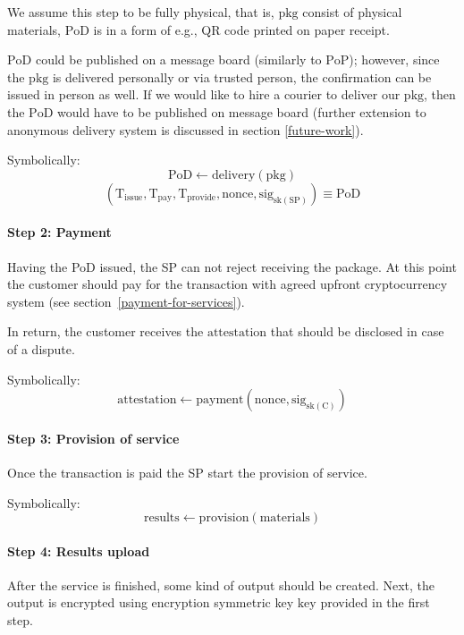 \documentclass{ieeeaccess}
\begin{document}
We assume this step to be fully physical, that is, $\mathrm{pkg}$ consist of physical materials, $\mathrm{PoD}$ is in a form of e.g., QR code printed on paper receipt. 

$\mathrm{PoD}$ could be published on a message board (similarly to $\mathrm{PoP}$); however, since the $\mathrm{pkg}$ is delivered personally or via trusted person, the confirmation can be issued in person as well. If we would like to hire a courier to deliver our $\mathrm{pkg}$, then the $\mathrm{PoD}$ would have to be published on message board (further extension to anonymous delivery system is discussed in section \ref{future-work}).

Symbolically: 
\[
\mathrm{PoD} \gets \mathrm{delivery}(\mathrm{pkg})
\]
\[
(\mathrm{T}_\mathrm{issue}, \mathrm{T}_\mathrm{pay}, \mathrm{T}_\mathrm{provide}, \mathrm{nonce}, \mathrm{sig}_{\mathrm{sk}(\mathrm{SP})}) \equiv \mathrm{PoD}
\]


\paragraph{Step 2: Payment}\label{step-2-payment}

Having the PoD issued, the SP can not reject receiving the package. At this point the
customer should pay for the transaction with agreed upfront cryptocurrency system (see section~\ref{payment-for-services}).

In return, the customer receives the $\mathrm{attestation}$ that should be disclosed in case of a dispute.

Symbolically: \[
\mathrm{attestation} \gets \mathrm{payment}(\mathrm{nonce}, \mathrm{sig}_{\mathrm{sk}(\mathrm{C})})
\]

\paragraph{Step 3: Provision of
service}\label{step-3-provision-of-service}
Once the transaction is paid the SP start the provision of service.

Symbolically: \[
\mathrm{results} \gets \mathrm{provision}(\mathrm{materials})
\]

\paragraph{Step 4: Results
upload}\label{step-4-results-upload}

After the service is finished, some kind of output should be created. Next, the output is encrypted using encryption symmetric key $\mathrm{key}$ provided in the first step.
\end{document}
